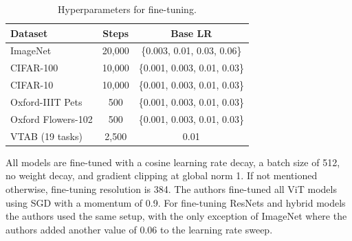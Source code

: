 \documentclass[conference]{IEEEtran}
\begin{document}
\begin{table}[htbp]
\centering
\small %
\caption{Hyperparameters for fine-tuning.}
\label{tab:hyperparameter_tuning}
\begin{tabular}{lcc} 
\toprule
\textbf{Dataset}            & \textbf{Steps}  & \textbf{Base LR}                           \\ 
\midrule
ImageNet                    & 20,000          & \{0.003, 0.01, 0.03, 0.06\}                \\ 
CIFAR-100                   & 10,000          & \{0.001, 0.003, 0.01, 0.03\}               \\ 
CIFAR-10                    & 10,000          & \{0.001, 0.003, 0.01, 0.03\}               \\ 
Oxford-IIIT Pets            & 500             & \{0.001, 0.003, 0.01, 0.03\}               \\ 
Oxford Flowers-102          & 500             & \{0.001, 0.003, 0.01, 0.03\}               \\ 
VTAB (19 tasks)             & 2,500           & 0.01                                       \\ 
\bottomrule
\end{tabular}
\end{table}

 All models are fine-tuned with a cosine learning rate decay, a batch size of 512, no weight decay, and gradient clipping at global norm 1. If not mentioned otherwise, fine-tuning resolution is 384.
The authors fine-tuned all ViT models using SGD with a momentum of 0.9.  For fine-tuning ResNets and hybrid models the authors used the same setup, with the only exception of ImageNet where the authors added another value of 0.06 to the learning rate sweep.
\end{document}
